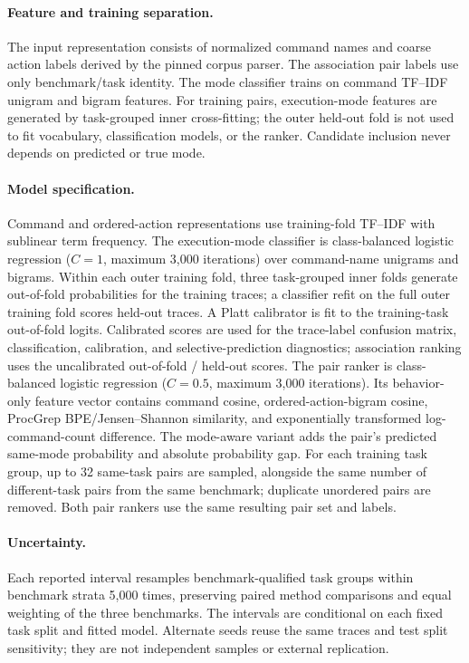 \paragraph{Feature and training separation.} The input representation consists of normalized command names and coarse action labels derived by the pinned corpus parser. The association pair labels use only benchmark/task identity. The mode classifier trains on command TF--IDF unigram and bigram features. For training pairs, execution-mode features are generated by task-grouped inner cross-fitting; the outer held-out fold is not used to fit vocabulary, classification models, or the ranker. Candidate inclusion never depends on predicted or true mode.

\paragraph{Model specification.} Command and ordered-action representations use training-fold TF--IDF with sublinear term frequency. The execution-mode classifier is class-balanced logistic regression ($C=1$, maximum 3,000 iterations) over command-name unigrams and bigrams. Within each outer training fold, three task-grouped inner folds generate out-of-fold probabilities for the training traces; a classifier refit on the full outer training fold scores held-out traces. A Platt calibrator is fit to the training-task out-of-fold logits. Calibrated scores are used for the trace-label confusion matrix, classification, calibration, and selective-prediction diagnostics; association ranking uses the uncalibrated out-of-fold / held-out scores. The pair ranker is class-balanced logistic regression ($C=0.5$, maximum 3,000 iterations). Its behavior-only feature vector contains command cosine, ordered-action-bigram cosine, ProcGrep BPE/Jensen--Shannon similarity, and exponentially transformed log-command-count difference. The mode-aware variant adds the pair's predicted same-mode probability and absolute probability gap. For each training task group, up to 32 same-task pairs are sampled, alongside the same number of different-task pairs from the same benchmark; duplicate unordered pairs are removed. Both pair rankers use the same resulting pair set and labels.

\paragraph{Uncertainty.} Each reported interval resamples benchmark-qualified task groups within benchmark strata 5,000 times, preserving paired method comparisons and equal weighting of the three benchmarks. The intervals are conditional on each fixed task split and fitted model. Alternate seeds reuse the same traces and test split sensitivity; they are not independent samples or external replication.

